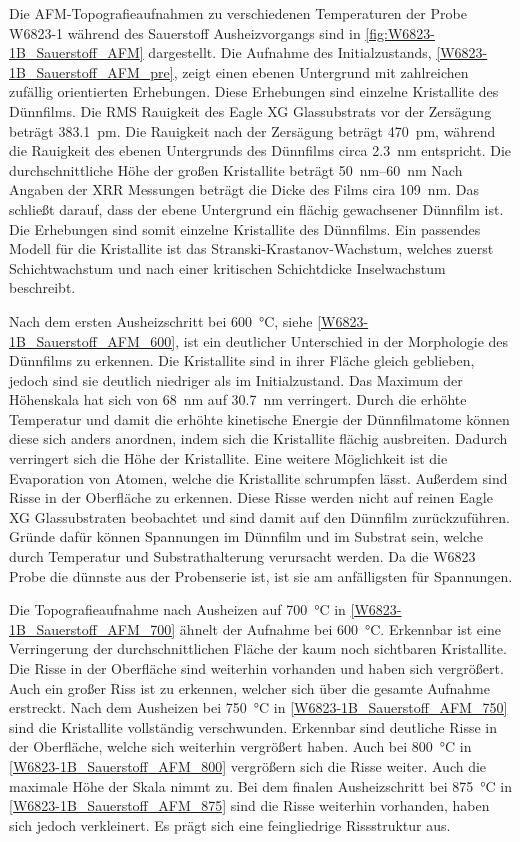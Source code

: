 Die AFM-Topografieaufnahmen zu verschiedenen Temperaturen der Probe W6823-1 während des Sauerstoff Ausheizvorgangs sind
in \cref{fig:W6823-1B_Sauerstoff_AFM} dargestellt.
Die Aufnahme des Initialzustands, \cref{W6823-1B_Sauerstoff_AFM_pre}, zeigt einen ebenen Untergrund mit zahlreichen
zufällig orientierten Erhebungen.
Diese Erhebungen sind einzelne Kristallite des Dünnfilms.
Die RMS Rauigkeit des Eagle XG Glassubstrats vor der Zersägung beträgt \qty{383.1}{\pico\meter}.
Die Rauigkeit nach der Zersägung beträgt \qty{470}{\pico\meter}, während die Rauigkeit des ebenen Untergrunds des
Dünnfilms circa \qty{2.3}{\nano\meter} entspricht.
Die durchschnittliche Höhe der großen Kristallite beträgt \qtyrange{50}{60}{\nano\meter}
Nach Angaben der XRR Messungen beträgt die Dicke des Films cira \qty{109}{\nano\meter}.
Das schließt darauf, dass der ebene Untergrund ein flächig gewachsener Dünnfilm ist.
Die Erhebungen sind somit einzelne Kristallite des Dünnfilms.
Ein passendes Modell für die Kristallite ist das Stranski-Krastanov-Wachstum, welches
zuerst Schichtwachstum und nach einer kritischen Schichtdicke Inselwachstum beschreibt.

Nach dem ersten Ausheizschritt bei \qty{600}{\degreeCelsius}, siehe \cref{W6823-1B_Sauerstoff_AFM_600}, ist ein
deutlicher Unterschied in der Morphologie des Dünnfilms zu erkennen.
Die Kristallite sind in ihrer Fläche gleich geblieben, jedoch sind sie deutlich niedriger als im Initialzustand.
Das Maximum der Höhenskala hat sich von \qty{68}{\nano\meter} auf \qty{30.7}{\nano\meter} verringert.
Durch die erhöhte Temperatur und damit die erhöhte kinetische Energie der Dünnfilmatome können diese sich
anders anordnen, indem sich die Kristallite flächig ausbreiten.
Dadurch verringert sich die Höhe der Kristallite.
Eine weitere Möglichkeit ist die Evaporation von Atomen, welche die Kristallite schrumpfen lässt.
Außerdem sind Risse in der Oberfläche zu erkennen.
Diese Risse werden nicht auf reinen Eagle XG Glassubstraten beobachtet und sind damit auf den Dünnfilm zurückzuführen.
Gründe dafür können Spannungen im Dünnfilm und im Substrat sein, welche durch Temperatur und Substrathalterung
verursacht werden.
Da die W6823 Probe die dünnste aus der Probenserie ist, ist sie am anfälligsten für Spannungen.

Die Topografieaufnahme nach Ausheizen auf \qty{700}{\degreeCelsius} in \cref{W6823-1B_Sauerstoff_AFM_700} ähnelt
der Aufnahme bei \qty{600}{\degreeCelsius}.
Erkennbar ist eine Verringerung der durchschnittlichen Fläche der kaum noch sichtbaren Kristallite.
Die Risse in der Oberfläche sind weiterhin vorhanden und haben sich vergrößert.
Auch ein großer Riss ist zu erkennen, welcher sich über die gesamte Aufnahme erstreckt.
Nach dem Ausheizen bei \qty{750}{\degreeCelsius} in \cref{W6823-1B_Sauerstoff_AFM_750} sind die Kristallite
vollständig verschwunden.
Erkennbar sind deutliche Risse in der Oberfläche, welche sich weiterhin vergrößert haben.
Auch bei \qty{800}{\degreeCelsius} in \cref{W6823-1B_Sauerstoff_AFM_800} vergrößern sich die Risse weiter.
Auch die maximale Höhe der Skala nimmt zu.
Bei dem finalen Ausheizschritt bei \qty{875}{\degreeCelsius} in \cref{W6823-1B_Sauerstoff_AFM_875} sind die Risse
weiterhin vorhanden, haben sich jedoch verkleinert.
Es prägt sich eine feingliedrige Rissstruktur aus.

